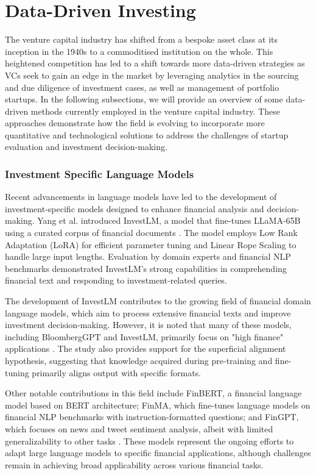 \documentclass[a4paper, oneside]{discothesis}
\begin{document}
\section{Data-Driven Investing}
The venture capital industry has shifted from a bespoke asset class at its inception in the 1940s to a commoditised institution on the whole. This heightened competition has led to a shift towards more data-driven strategies as VCs seek to gain an edge in the market by leveraging analytics in the sourcing and due diligence of investment cases, as well as management of portfolio startups. In the following subsections, we will provide an overview of some data-driven methods currently employed in the venture capital industry. These approaches demonstrate how the field is evolving to incorporate more quantitative and technological solutions to address the challenges of startup evaluation and investment decision-making.

\subsubsection{Investment Specific Language Models}
Recent advancements in language models have led to the development of investment-specific models designed to enhance financial analysis and decision-making. Yang et al. introduced InvestLM, a model that fine-tunes LLaMA-65B using a curated corpus of financial documents \cite{yang2023investlm}. The model employs Low Rank Adaptation (LoRA) for efficient parameter tuning and Linear Rope Scaling to handle large input lengths. Evaluation by domain experts and financial NLP benchmarks demonstrated InvestLM's strong capabilities in comprehending financial text and responding to investment-related queries.

The development of InvestLM contributes to the growing field of financial domain language models, which aim to process extensive financial texts and improve investment decision-making. However, it is noted that many of these models, including BloombergGPT and InvestLM, primarily focus on "high finance" applications \cite{yang2023investlm}. The study also provides support for the superficial alignment hypothesis, suggesting that knowledge acquired during pre-training and fine-tuning primarily aligns output with specific formats.

Other notable contributions in this field include FinBERT, a financial language model based on BERT architecture; FinMA, which fine-tunes language models on financial NLP benchmarks with instruction-formatted questions; and FinGPT, which focuses on news and tweet sentiment analysis, albeit with limited generalizability to other tasks \cite{araci2019finbert, liu2023finma, yang2023fingpt}. These models represent the ongoing efforts to adapt large language models to specific financial applications, although challenges remain in achieving broad applicability across various financial tasks.
\end{document}
